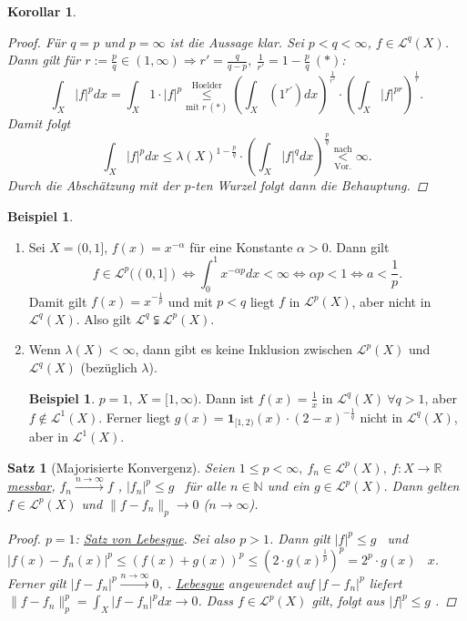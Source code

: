 \documentclass[a4paper]{scrreprt}
\newcommand{\doubleOne}{\textbf{1}}
\newcommand{\R}{\mathbb{R}}
\newcommand{\N}{\mathbb{N}}
\newcommand{\Leb}{\mathcal{L}}
\newcommand{\overunderset}[3]{\overset{#1}{\underset{#3}{#2}}}
\newcommand{\jlabel}[1]{\label{j_#1}}
\newcommand{\jshortlink}[1]{\jhyperref{#1}{\text{#1}}}
\newcommand{\jhyperref}[2]{\hyperref[j_#1]{#2}}
\newcommand{\jlink}[1]{\jhyperref{#1}{#1}}
\newcommand{\fu}{\text{\textit{(f.ü.)}}}
\newcommand{\fa}{\text{\textit{(f.a.)}}}
\newcommand{\jabb}[3]{ #1: #2 \rightarrow #3 }
\theoremstyle{plain}
\newtheorem{satz}[thm]{Satz}
\newtheorem{kor}[thm]{Korollar}
\theoremstyle{definition}
\newtheorem{expl}[thm]{Beispiel}
\newtheorem*{expl*}{Beispiel}
\begin{document}
{{{{\begin{kor}
    \begin{proof}
        Für $q=p$ und $p=\infty$ ist die Aussage klar. Sei $p<q<\infty$, $f\in \Leb^q(X)$. Dann gilt für $r:=\frac{p}{q}\in (1,\infty) \Rightarrow r' = \frac{q}{q-p},\ \frac{1}{r'} = 1-\frac{p}{q}\ (*)$:
        \[
            \int_X |f|^p dx = \int_X 1\cdot |f|^p \overunderset{\jshortlink{Hoelder}}{\le}{\text{mit }r\ (*)} \left(\int_X \left(1^{r'} \right) dx \right)^\frac{1}{r'} \cdot \left(\int_X |f|^{pr} \right)^\frac{1}{r}.
        \]
        Damit folgt
        \[
            \int_X |f|^p dx \le \lambda(X)^{1-\frac{p}{q}} \cdot \left(\int_X |f|^q dx \right)^\frac{p}{q} \overunderset{\text{nach}}{<}{\text{Vor.}} \infty.
        \]
        Durch die Abschätzung mit der $p$-ten Wurzel folgt dann die Behauptung.
    \end{proof}
\end{kor}


\jlabel{Bsp 5.4}
\begin{expl}
    \begin{enumerate}
        \item
            \jlabel{Bsp 5.4a)}
            Sei $X=(0,1]$, $f(x)= x^{-\alpha}$ für eine Konstante $\alpha >0$. Dann gilt
            \[
                f\in \Leb^p((0,1]) \Leftrightarrow \int_0^1 x^{-\alpha p}dx < \infty \Leftrightarrow \alpha p < 1 \Leftrightarrow a < \frac{1}{p}.
            \]
            Damit gilt $f(x)=x^{-\frac{1}{p}}$ und mit $p<q$ liegt $f$ in $\Leb^p(X)$, aber nicht in $\Leb^q(X)$. Also gilt $\Leb^q \subsetneqq \Leb^p(X)$.
            
        \item
            \jlabel{Bsp 5.4b)}
            Wenn $\lambda(X)<\infty$, dann gibt es keine Inklusion zwischen $\Leb^p(X)$ und $\Leb^q(X)$ (bezüglich $\lambda$).
            \begin{expl*}
                $p=1,\ X=[1,\infty)$. Dann ist $f(x)=\frac{1}{x}$ in $\Leb^q(X)\ \forall q > 1$, aber $f\notin \Leb^1(X)$. Ferner liegt $g(x)=\doubleOne_{[1,2)}(x)\cdot(2-x)^{-\frac{1}{q}}$ nicht in $\Leb^q(X)$, aber in $\Leb^1(X)$.
            \end{expl*}
    \end{enumerate}
\end{expl}

\begin{satz}[Majorisierte Konvergenz]
    \jlabel{Satz 5.5}
    Seien $1\le p <\infty,\ f_n \in \Leb^p(X),\ \jabb{f}{X}{\R}$ \jlink{messbar}, $f_n\xrightarrow{n\to\infty}f$ \fu, $|f_n|^p \le g$ \fu\ für alle $n\in\N$ und ein \uline{$g\in \Leb^p(X)$}. Dann gelten $f\in \Leb^p(X)$ und $\lVert f- f_n \rVert_p \to 0$ ($n\to \infty$).
    \begin{proof}
        $p=1$: \jhyperref{Thm 3.10}{Satz von Lebesgue}. Sei also $p>1$. Dann gilt $|f|^p \le g$ \fu\ und $|f(x)-f_n(x)|^p \le (f(x)+g(x))^p \le (2\cdot g(x)^\frac{1}{p})^p = 2^p\cdot g(x)$ \fa\ $x$. Ferner gilt $|f-f_n|^p \xrightarrow{n\to \infty} 0$, \fu. \jhyperref{Thm 3.10}{Lebesgue} angewendet auf $|f-f_n|^p$ liefert $\lVert f-f_n \rVert_p^p = \int_X |f-f_n|^p dx \to 0$. Dass $f\in \Leb^p(X)$ gilt, folgt aus $|f|^p \le g$ \fu.
    \end{proof}
\end{satz}

}}}}
\end{document}
